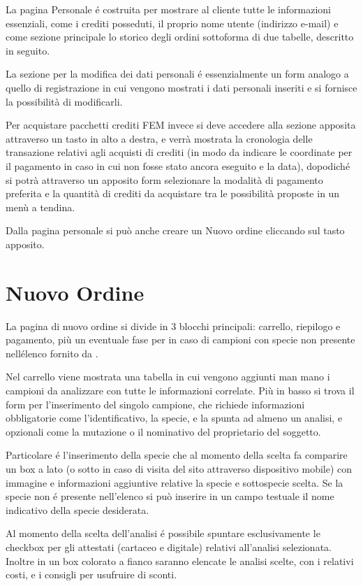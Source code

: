 La pagina Personale é costruita per mostrare al cliente tutte le informazioni essenziali, come i crediti posseduti, il proprio nome utente (indirizzo e-mail) e come sezione principale lo storico degli ordini sottoforma di due tabelle, descritto in seguito.

La sezione per la modifica dei dati personali é essenzialmente un form analogo a quello di registrazione in cui vengono mostrati i dati personali inseriti e si fornisce la possibilità di modificarli.

Per acquistare pacchetti crediti FEM invece si deve accedere alla sezione apposita attraverso un tasto in alto a destra, e verrà mostrata la cronologia delle transazione relativi agli acquisti di crediti (in modo da indicare le coordinate per il pagamento in caso in cui non fosse stato ancora eseguito e la data), dopodiché si potrà attraverso un apposito form selezionare la modalità di pagamento preferita e la quantità di crediti da acquistare tra le possibilità proposte in un menù a tendina.

Dalla pagina personale si può anche creare un \textsf{Nuovo ordine} cliccando sul tasto apposito.

\section*{Nuovo Ordine}
La pagina di nuovo ordine si divide in 3 blocchi principali: \textsf{carrello}, \textsf{riepilogo} e \textsf{pagamento}, più un eventuale fase per in caso di campioni con specie non presente nellélenco fornito da {\fem}.

Nel \textsf{carrello} viene mostrata una tabella in cui vengono aggiunti man mano i campioni da analizzare con tutte le informazioni correlate. Più in basso si trova il form per l'inserimento del singolo campione, che richiede informazioni obbligatorie come l'identificativo, la specie, e la spunta ad almeno un analisi, e opzionali come la mutazione o il nominativo del proprietario del soggetto.

Particolare é l'inserimento della specie che al momento della scelta fa comparire un box a lato (o sotto in caso di visita del sito attraverso dispositivo mobile) con immagine e informazioni aggiuntive relative la specie e sottospecie scelta. Se la specie non é presente nell'elenco si può inserire in un campo testuale il nome indicativo della specie desiderata.

Al momento della scelta dell'analisi é possibile spuntare esclusivamente le checkbox per gli attestati (cartaceo e digitale) relativi all'analisi selezionata. Inoltre in un box colorato a fianco saranno elencate le analisi scelte, con i relativi costi, e i consigli per usufruire di sconti.

